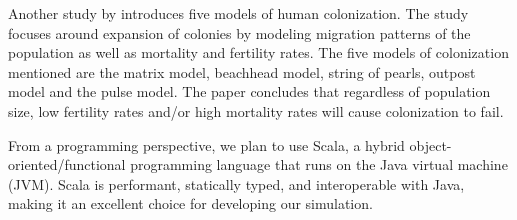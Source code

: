 \documentclass[12pt]{article}
\begin{document}
Another study by \cite{moore2001evaluating} introduces five models of human colonization.  The study focuses around expansion of colonies by modeling migration patterns of the population as well as mortality and fertility rates.  The five models of colonization mentioned are the matrix model, beachhead model, string of pearls, outpost model and the pulse model.  The paper concludes that regardless of population size, low fertility rates and/or high mortality rates will cause colonization to fail.  

From a programming perspective, we plan to use Scala, a hybrid
object-oriented/functional programming language that runs on the Java virtual
machine (JVM). Scala is performant, statically typed, and interoperable with
Java, making it an excellent choice for developing our simulation.

\clearpage
{}

\end{document}
